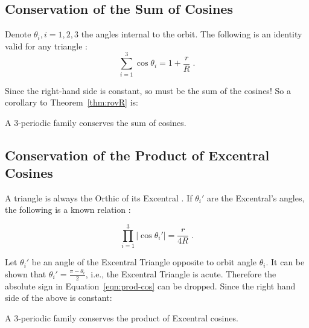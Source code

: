 \subsection{Conservation of the Sum of Cosines}

Denote $\theta_i,i=1,2,3$ the angles internal to the orbit. The following is an identity valid for any triangle \cite{johnson29}:
%
\begin{equation}
\sum_{i=1}^{3}{\cos\theta_i}=1+\frac{r}{R}\;.
\label{eqn:rR_cos}
\end{equation}

Since the right-hand side is constant, so must be the sum of the cosines! So a corollary to Theorem~\ref{thm:rovR} is:

\begin{corollary}
\label{cor8}
A 3-periodic family conserves the sum of cosines. 
\end{corollary}

\subsection{Conservation of the Product of Excentral Cosines}

A triangle is always the Orthic of its Excentral \cite{mw}. If $\theta_i'$ are the Excentral's angles, the following is a known relation \cite{johnson29}:

\begin{equation}
\prod_{i=1}^{3}{|\cos\theta_i'|}=\frac{r}{4R}\;.
\label{eqn:prod-cos}
\end{equation}

Let $\theta_i'$ be an angle of the Excentral Triangle opposite to orbit angle $\theta_i$. It can be shown that $\theta_i'=\frac{\pi-\theta_i}{2}$, i.e., the Excentral Triangle is acute. Therefore the absolute sign in Equation~\ref{eqn:prod-cos} can be dropped. Since the right hand side of the above is constant:

\begin{corollary}
\label{cor9}
A 3-periodic family conserves the product of Excentral cosines. 
\end{corollary}

